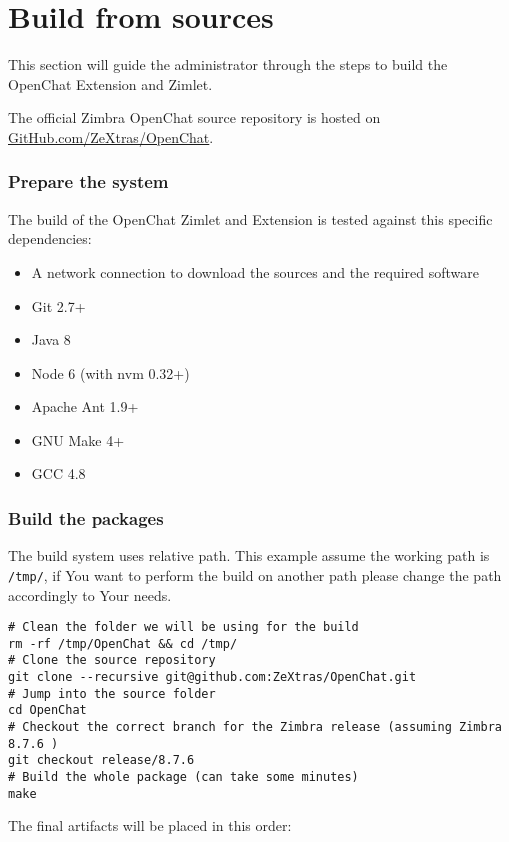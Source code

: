\section{Build from sources}
\label{sect:buildfromsrcs}

This section will guide the administrator through the steps to build the OpenChat Extension and Zimlet.

The official Zimbra OpenChat source repository is hosted on \href{https://www.github.com/ZeXtras/OpenChat}{GitHub.com/ZeXtras/OpenChat}.

\subsubsection{Prepare the system}
    The build of the OpenChat Zimlet and Extension is tested against this specific dependencies:
    \begin{itemize}
        \item A network connection to download the sources and the required software
        \item Git 2.7+
        \item Java 8
        \item Node 6 (with nvm 0.32+)
        \item Apache Ant 1.9+
        \item GNU Make 4+
        \item GCC 4.8
    \end{itemize}

\subsubsection{Build the packages}
    The build system uses relative path.
    This example assume the working path is \verb+/tmp/+, if You want to perform the build on another path please change
    the path accordingly to Your needs.
    \begin{verbatim}
# Clean the folder we will be using for the build
rm -rf /tmp/OpenChat && cd /tmp/
# Clone the source repository
git clone --recursive git@github.com:ZeXtras/OpenChat.git
# Jump into the source folder
cd OpenChat
# Checkout the correct branch for the Zimbra release (assuming Zimbra 8.7.6 )
git checkout release/8.7.6
# Build the whole package (can take some minutes)
make
    \end{verbatim}

    The final artifacts will be placed in this order:

